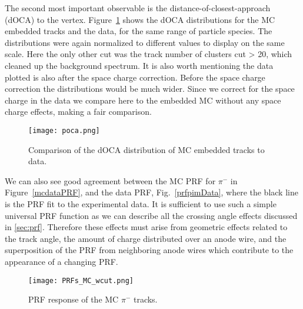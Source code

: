The second most important observable is the distance-of-closest-approach (dOCA) to the vertex. Figure~\ref{fig:pocacomp} shows the dOCA distributions for the MC embedded tracks and the data, for the same range of particle species. The distributions were again normalized to different values to display on the same scale. Here the only other cut was the  track number of clusters cut > 20, which cleaned up the background spectrum. It is also worth mentioning the data plotted is also after the space charge correction. Before the space charge correction the distributions would be much wider. Since we correct for the space charge in the data we compare here to the embedded MC without any space charge effects, making a fair comparison. 

\begin{figure}[!hbt]
\texttt{[image: poca.png]}
\caption{Comparison of the dOCA distribution of MC embedded tracks to data.}
\label{fig:pocacomp}
\end{figure}


We can also see good agreement between the MC PRF for $\pi^-$ in Figure~\ref{mcdataPRF}, and the data PRF, Fig.~\ref{prfpimData}, where the black line is the PRF fit to the experimental data. It is sufficient to use such a simple universal PRF function as we can describe all the crossing angle effects discussed in \ref{sec:prf}. Therefore these effects must arise from geometric effects related to the track angle, the amount of charge distributed over an anode wire, and the superposition of the PRF from neighboring anode wires which contribute to the appearance of a changing PRF.

\begin{figure}[!htb]
         \centering
         \texttt{[image: PRFs\_MC\_wcut.png]}
         \caption{PRF response of the MC $\pi^-$ tracks.}
         \label{fig:prfpimMC}
\end{figure}









